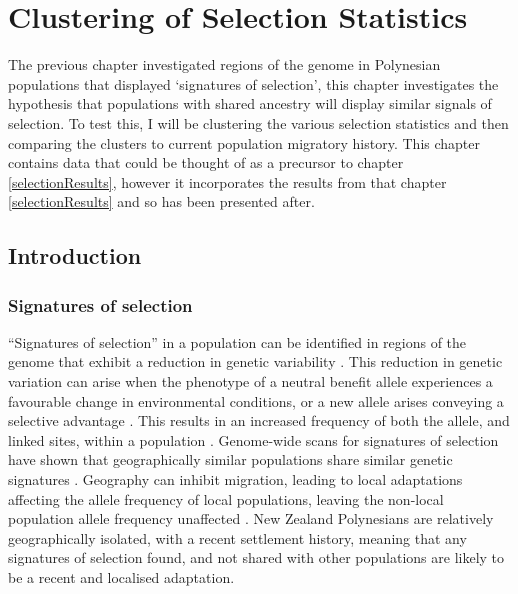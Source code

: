\documentclass[]{report}
\begin{document}
\chapter{Clustering of Selection Statistics}\label{clustering}

\glsresetall

The previous chapter investigated regions of the genome in Polynesian
populations that displayed `signatures of selection', this chapter
investigates the hypothesis that populations with shared ancestry will
display similar signals of selection. To test this, I will be clustering
the various selection statistics and then comparing the clusters to
current population migratory history. This chapter contains data that
could be thought of as a precursor to chapter \ref{selectionResults},
however it incorporates the results from that chapter
\ref{selectionResults} and so has been presented after.

\section{Introduction}\label{chap4Intro}

\subsection{Signatures of selection}\label{signatures-of-selection}

``Signatures of selection'' in a population can be identified in regions
of the genome that exhibit a reduction in genetic variability
\citep{Smith1974, Kaplan1989, McVean2007}. This reduction in genetic
variation can arise when the phenotype of a neutral benefit allele
experiences a favourable change in environmental conditions, or a new
allele arises conveying a selective advantage \citep{Hermisson2005}.
This results in an increased frequency of both the allele, and linked
sites, within a population \citep{Smith1974}. Genome-wide scans for
signatures of selection have shown that geographically similar
populations share similar genetic signatures
\citep{Coop2009, pickrell2009signals}. Geography can inhibit migration,
leading to local adaptations affecting the allele frequency of local
populations, leaving the non-local population allele frequency
unaffected \citep{Coop2009}. New Zealand Polynesians are relatively
geographically isolated, with a recent settlement history, meaning that
any signatures of selection found, and not shared with other populations
are likely to be a recent and localised adaptation.
\end{document}
